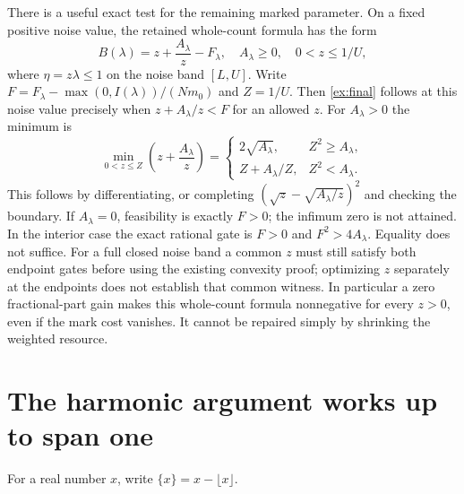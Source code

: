 \documentclass[11pt]{article}
\begin{document}
There is a useful exact test for the remaining marked parameter. On a
fixed positive noise value, the retained whole-count formula has the form
\[
 B(\lambda)=z+\frac{A_\lambda}{z}-F_\lambda,
 \quad A_\lambda\ge0,\quad0<z\le1/U,
\]
where $\eta=z\lambda\le1$ on the noise band $[L,U]$.
Write $F=F_\lambda-\max(0,I(\lambda))/(Nm_0)$ and $Z=1/U$.
Then \eqref{ex:final} follows at this noise value precisely when
$z+A_\lambda/z<F$ for an allowed $z$.
For $A_\lambda>0$ the minimum is
\begin{equation}\label{ex:onevariable}
 \min_{0<z\le Z}\left(z+\frac{A_\lambda}{z}\right)
 =\begin{cases}
    2\sqrt{A_\lambda},&Z^2\ge A_\lambda,\\
    Z+A_\lambda/Z,&Z^2<A_\lambda.
   \end{cases}
\end{equation}
This follows by differentiating, or completing
$(\sqrt z-\sqrt{A_\lambda/z})^2$ and checking the boundary.
If $A_\lambda=0$, feasibility is exactly $F>0$; the infimum zero is
not attained. In the interior case the exact rational gate is
$F>0$ and $F^2>4A_\lambda$. Equality does not suffice.
For a full closed noise band a common $z$ must still satisfy both
endpoint gates before using the existing convexity proof; optimizing $z$
separately at the endpoints does not establish that common witness.
In particular a zero fractional-part gain makes this whole-count formula
nonnegative for every $z>0$, even if the mark cost vanishes. It cannot be
repaired simply by shrinking the weighted resource.

\section{The harmonic argument works up to span one}
For a real number $x$, write $\{x\}=x-\lfloor x\rfloor$.
\end{document}
